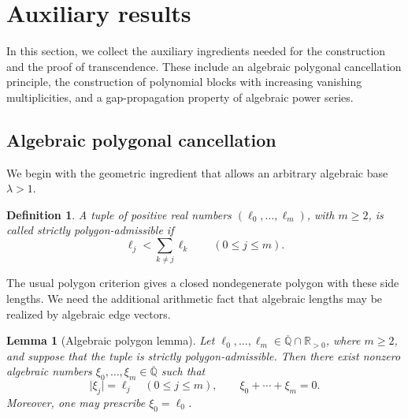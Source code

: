 \documentclass[10pt,a4paper]{amsart}
\newtheorem{lemma}[theorem]{Lemma}
\newtheorem{definition}[theorem]{Definition}
\numberwithin{equation}{section}
\newcommand{\R}{\mathbb R}
\newcommand{\Qbar}{\overline{\mathbb Q}}
\newcommand{\abs}[1]{\lvert #1\rvert}
\begin{document}
\section{Auxiliary results}

In this section, we collect the auxiliary ingredients needed for the
construction and the proof of transcendence. These include an algebraic
polygonal cancellation principle, the construction of polynomial blocks
with increasing vanishing multiplicities, and a gap-propagation property
of algebraic power series.

\subsection{Algebraic polygonal cancellation}

We begin with the geometric ingredient that allows an arbitrary algebraic
base $\lambda>1$.

\begin{definition}
A tuple of positive real numbers $(\ell_0,\ldots,\ell_m)$, with $m\geq2$,
is called \emph{strictly polygon-admissible} if
\begin{equation}\label{eq:polygon-inequalities}
        \ell_j<\sum_{k\neq j}\ell_k
        \qquad(0\leq j\leq m).
\end{equation}
\end{definition}

The usual polygon criterion gives a closed nondegenerate polygon with these
side lengths. We need the additional arithmetic fact that algebraic lengths
may be realized by algebraic edge vectors.

\begin{lemma}[Algebraic polygon lemma]\label{lemma:algebraic-polygon}
Let $\ell_0,\ldots,\ell_m\in\Qbar\cap\R_{>0}$, where $m\geq2$, and suppose
that the tuple is strictly polygon-admissible. Then there exist nonzero
algebraic numbers $\xi_0,\ldots,\xi_m\in\Qbar$ such that
\[
        \abs{\xi_j}=\ell_j\quad(0\leq j\leq m),
        \qquad
        \xi_0+\cdots+\xi_m=0.
\]
Moreover, one may prescribe $\xi_0=\ell_0$.
\end{lemma}
\end{document}
